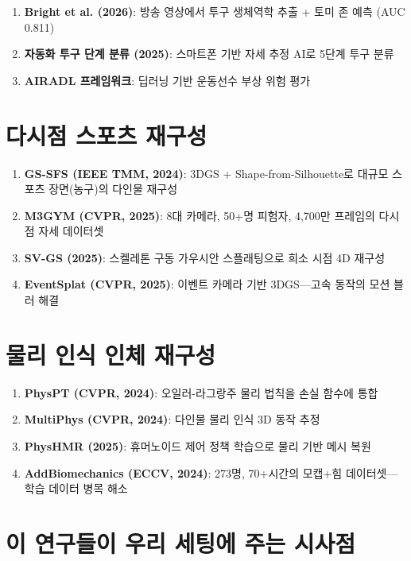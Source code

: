 \documentclass[11pt, a4paper]{report}
\begin{document}
\begin{enumerate}[leftmargin=*]
  \item \textbf{Bright et al. (2026)}: 방송 영상에서 투구 생체역학 추출 + 토미 존 예측 (AUC 0.811)
  \item \textbf{자동화 투구 단계 분류 (2025)}: 스마트폰 기반 자세 추정 AI로 5단계 투구 분류
  \item \textbf{AIRADL 프레임워크}: 딥러닝 기반 운동선수 부상 위험 평가
\end{enumerate}

\section{다시점 스포츠 재구성}

\begin{enumerate}[leftmargin=*]
  \item \textbf{GS-SFS (IEEE TMM, 2024)}: 3DGS + Shape-from-Silhouette로 대규모 스포츠 장면(농구)의 다인물 재구성
  \item \textbf{M3GYM (CVPR, 2025)}: 8대 카메라, 50+명 피험자, 4,700만 프레임의 다시점 자세 데이터셋
  \item \textbf{SV-GS (2025)}: 스켈레톤 구동 가우시안 스플래팅으로 희소 시점 4D 재구성
  \item \textbf{EventSplat (CVPR, 2025)}: 이벤트 카메라 기반 3DGS---고속 동작의 모션 블러 해결
\end{enumerate}

\section{물리 인식 인체 재구성}

\begin{enumerate}[leftmargin=*]
  \item \textbf{PhysPT (CVPR, 2024)}: 오일러-라그랑주 물리 법칙을 손실 함수에 통합
  \item \textbf{MultiPhys (CVPR, 2024)}: 다인물 물리 인식 3D 동작 추정
  \item \textbf{PhysHMR (2025)}: 휴머노이드 제어 정책 학습으로 물리 기반 메시 복원
  \item \textbf{AddBiomechanics (ECCV, 2024)}: 273명, 70+시간의 모캡+힘 데이터셋---학습 데이터 병목 해소
\end{enumerate}

\section{이 연구들이 우리 세팅에 주는 시사점}
\end{document}
